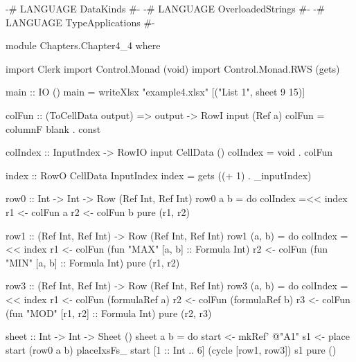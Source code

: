{-# LANGUAGE DataKinds #-}
{-# LANGUAGE OverloadedStrings #-}
{-# LANGUAGE TypeApplications #-}

module Chapters.Chapter4_4 where

import Clerk
import Control.Monad (void)
import Control.Monad.RWS (gets)

main :: IO ()
main = writeXlsx "example4.xlsx" [("List 1", sheet 9 15)]

colFun :: (ToCellData output) => output -> RowI input (Ref a)
colFun = columnF blank . const

colIndex :: InputIndex -> RowIO input CellData ()
colIndex = void . colFun

index :: RowO CellData InputIndex
index = gets ((+ 1) . _inputIndex)

row0 :: Int -> Int -> Row (Ref Int, Ref Int)
row0 a b = do
  colIndex =<< index
  r1 <- colFun a
  r2 <- colFun b
  pure (r1, r2)

row1 :: (Ref Int, Ref Int) -> Row (Ref Int, Ref Int)
row1 (a, b) =
  do
    colIndex =<< index
    r1 <- colFun (fun "MAX" [a, b] :: Formula Int)
    r2 <- colFun (fun "MIN" [a, b] :: Formula Int)
    pure (r1, r2)

row3 :: (Ref Int, Ref Int) -> Row (Ref Int, Ref Int)
row3 (a, b) = do
  colIndex =<< index
  r1 <- colFun (formulaRef a)
  r2 <- colFun (formulaRef b)
  r3 <- colFun (fun "MOD" [r1, r2] :: Formula Int)
  pure (r2, r3)

sheet :: Int -> Int -> Sheet ()
sheet a b = do
  start <- mkRef' @"A1"
  s1 <- place start (row0 a b)
  placeIxsFs_ start [1 :: Int .. 6] (cycle [row1, row3]) s1
  pure ()
